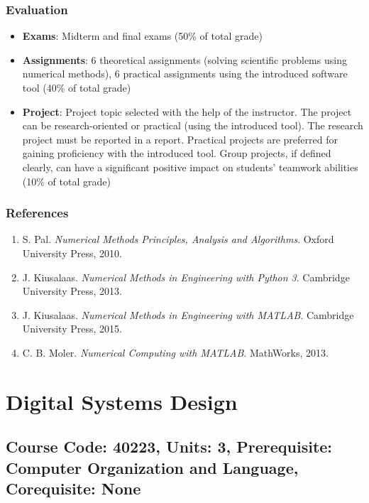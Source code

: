\documentclass[12pt]{article}
\begin{document}
\subsubsection*{Evaluation}
\begin{itemize}
    \item \textbf{Exams}: Midterm and final exams (50\% of total grade)
    \item \textbf{Assignments}: 6 theoretical assignments (solving scientific problems using numerical methods), 6 practical assignments using the introduced software tool (40\% of total grade)
    \item \textbf{Project}: Project topic selected with the help of the instructor. The project can be research-oriented or practical (using the introduced tool). The research project must be reported in a report. Practical projects are preferred for gaining proficiency with the introduced tool. Group projects, if defined clearly, can have a significant positive impact on students' teamwork abilities (10\% of total grade)
\end{itemize}

\subsubsection*{References}
\begin{enumerate}
    \item S. Pal. \textit{Numerical Methods Principles, Analysis and Algorithms}. Oxford University Press, 2010.
    \item J. Kiusalaas. \textit{Numerical Methods in Engineering with Python 3}. Cambridge University Press, 2013.
    \item J. Kiusalaas. \textit{Numerical Methods in Engineering with MATLAB}. Cambridge University Press, 2015.
    \item C. B. Moler. \textit{Numerical Computing with MATLAB}. MathWorks, 2013.
\end{enumerate}

\newpage

\section{Digital Systems Design}
\subsection*{Course Code: 40223, Units: 3, Prerequisite: Computer Organization and Language, Corequisite: None}
\end{document}
